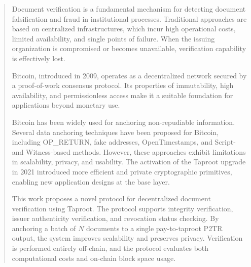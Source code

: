 \begin{abstract}

Document verification is a fundamental mechanism for detecting document falsification and fraud in institutional processes.
Traditional approaches are based on centralized infrastructures, which incur high operational costs, limited availability, and single points of failure.
When the issuing organization is compromised or becomes unavailable, verification capability is effectively lost.

Bitcoin, introduced in 2009, operates as a decentralized network secured by a proof-of-work consensus protocol.
Its properties of immutability, high availability, and permissionless access make it a suitable foundation for applications beyond monetary use.

Bitcoin has been widely used for anchoring non-repudiable information.
Several data anchoring techniques have been proposed for Bitcoin, including OP\_RETURN, fake addresses, OpenTimestamps, and Script- and Witness-based methods.
However, these approaches exhibit limitations in scalability, privacy, and usability.
The activation of the Taproot upgrade in 2021 introduced more efficient and private cryptographic primitives, enabling new application designs at the base layer.

This work proposes a novel protocol for decentralized document verification using Taproot.
The protocol supports integrity verification, issuer authenticity verification, and revocation status checking.
By anchoring a batch of $N$ documents to a single pay-to-taproot P2TR output, the system improves scalability and preserves privacy.
Verification is performed entirely off-chain, and the protocol evaluates both computational costs and on-chain block space usage.
\end{abstract}